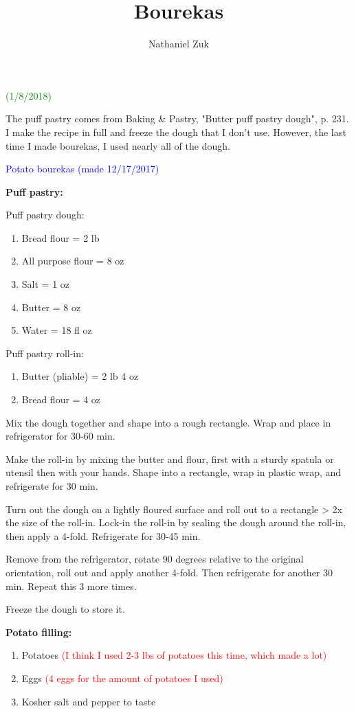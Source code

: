 \documentclass[11pt]{article}
\title{Bourekas}
\author{Nathaniel Zuk}
\begin{document}
\maketitle

\textcolor{green}{(1/8/2018)}

The puff pastry comes from Baking \& Pastry, "Butter puff pastry dough", p. 231.  I make the recipe in full and freeze the dough that I don't use.  However, the last time I made bourekas, I used nearly all of the dough.

\textcolor{blue}{Potato bourekas (made 12/17/2017)}

\textbf{Puff pastry:}

Puff pastry dough:

\begin{enumerate}
\item Bread flour = 2 lb
\item All purpose flour = 8 oz
\item Salt = 1 oz
\item Butter = 8 oz
\item Water = 18 fl oz
\end{enumerate}

Puff pastry roll-in:

\begin{enumerate}
\item Butter (pliable) = 2 lb 4 oz
\item Bread flour = 4 oz
\end{enumerate}

Mix the dough together and shape into a rough rectangle.  Wrap and place in refrigerator for 30-60 min. 

Make the roll-in by mixing the butter and flour, first with a sturdy spatula or utensil then with your hands.  Shape into a rectangle, wrap in plastic wrap, and refrigerate for 30 min.

Turn out the dough on a lightly floured surface and roll out to a rectangle > 2x the size of the roll-in.  Lock-in the roll-in by sealing the dough around the roll-in, then apply a 4-fold.  Refrigerate for 30-45 min.

Remove from the refrigerator, rotate 90 degrees relative to the original orientation, roll out and apply another 4-fold.  Then refrigerate for another 30 min.  Repeat this 3 more times.

Freeze the dough to store it.

\textbf{Potato filling:}

\begin{enumerate}
\item Potatoes \textcolor{red}{(I think I used 2-3 lbs of potatoes this time, which made a lot)}
\item Eggs \textcolor{red}{(4 eggs for the amount of potatoes I used)}
\item Kosher salt and pepper to taste
\end{enumerate}
\end{document}
